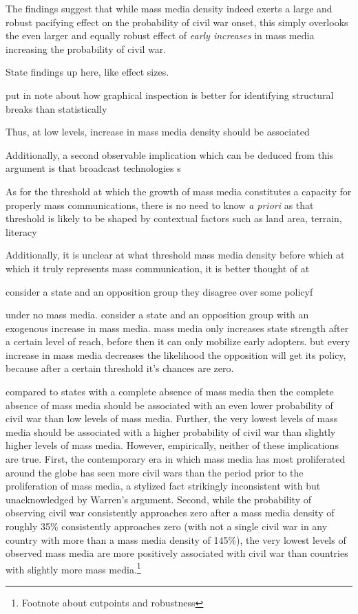 \documentclass[11pt,article,oneside]{memoir}
\begin{document}
The findings suggest that while mass media density indeed exerts a large
and robust pacifying effect on the probability of civil war onset, this
simply overlooks the even larger and equally robust effect of
\emph{early increases} in mass media increasing the probability of civil
war.

State findings up here, like effect sizes.

put in note about how graphical inspection is better for identifying
structural breaks than statistically

Thus, at low levels, increase in mass media density should be associated

Additionally, a second observable implication which can be deduced from
this argument is that broadcast technologies s

As for the threshold at which the growth of mass media constitutes a
capacity for properly mass communications, there is no need to know
\emph{a priori} as that threshold is likely to be shaped by contextual
factors such as land area, terrain, literacy

Additionally, it is unclear at what threshold mass media density before
which at which it truly represents mass communication, it is better
thought of at

consider a state and an opposition group they disagree over some policyf

under no mass media. consider a state and an opposition group with an
exogenous increase in mass media. mass media only increases state
strength after a certain level of reach, before then it can only
mobilize early adopters. but every increase in mass media decreases the
likelihood the opposition will get its policy, because after a certain
threshold it's chances are zero.

compared to states with a complete absence of mass media then the
complete absence of mass media should be associated with an even lower
probability of civil war than low levels of mass media. Further, the
very lowest levels of mass media should be associated with a higher
probability of civil war than slightly higher levels of mass media.
However, empirically, neither of these implications are true. First, the
contemporary era in which mass media has most proliferated around the
globe has seen more civil wars than the period prior to the
proliferation of mass media, a stylized fact strikingly inconsistent
with but unacknowledged by Warren's argument. Second, while the
probability of observing civil war consistently approaches zero after a
mass media density of roughly 35\% consistently approaches zero (with
not a single civil war in any country with more than a mass media
density of 145\%), the very lowest levels of observed mass media are
more positively associated with civil war than countries with slightly
more mass media.\footnote{Footnote about cutpoints and robustness}
\end{document}
